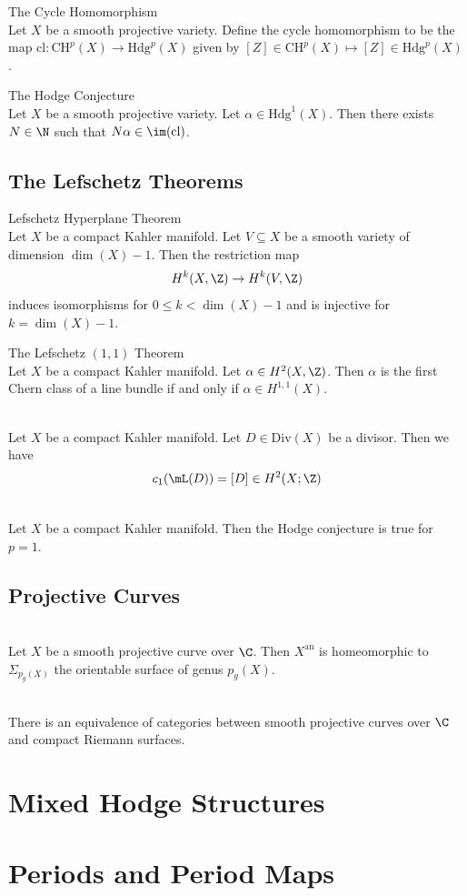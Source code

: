 \documentclass[a4paper]{article}
\begin{document}
\begin{defn}{The Cycle Homomorphism}{}\\
Let $X$ be a smooth projective variety. Define the cycle homomorphism to be the map $\text{cl}:\text{CH}^p(X)\to\text{Hdg}^p(X)$ given by $[Z]\in\text{CH}^p(X)\mapsto[Z]\in\text{Hdg}^p(X)$. 
\end{defn}

\begin{conj}{The Hodge Conjecture}{}\\
Let $X$ be a smooth projective variety. Let $\alpha\in\text{Hdg}^1(X)$. Then there exists $N\in\N$ such that $N\alpha\in\im(\text{cl})$. 
\end{conj}

\subsection{The Lefschetz Theorems}
\begin{thm}{Lefschetz Hyperplane Theorem}{}\\
Let $X$ be a compact Kahler manifold. Let $V\subseteq X$ be a smooth variety of dimension $\dim(X)-1$. Then the restriction map $$H^k(X,\Z)\to H^k(V,\Z)$$ induces isomorphisms for $0\leq k<\dim(X)-1$ and is injective for $k=\dim(X)-1$. 
\end{thm}

\begin{thm}{The Lefschetz $(1,1)$ Theorem}{}\\
Let $X$ be a compact Kahler manifold. Let $\alpha\in H^2(X,\Z)$. Then $\alpha$ is the first Chern class of a line bundle if and only if $\alpha\in H^{1,1}(X)$. 
\end{thm}

\begin{prp}{}{}\\
Let $X$ be a compact Kahler manifold. Let $D\in\text{Div}(X)$ be a divisor. Then we have $$c_1(\mL(D))=[D]\in H^2(X;\Z)$$
\end{prp}

\begin{crl}{}{}\\
Let $X$ be a compact Kahler manifold. Then the Hodge conjecture is true for $p=1$. 
\end{crl}

\subsection{Projective Curves}
\begin{prp}{}{}\\
Let $X$ be a smooth projective curve over $\C$. Then $X^\text{an}$ is homeomorphic to $\Sigma_{p_g(X)}$ the orientable surface of genus $p_g(X)$. 
\end{prp}

\begin{crl}{}{}\\
There is an equivalence of categories between smooth projective curves over $\C$ and compact Riemann surfaces. 
\end{crl}

\pagebreak
\section{Mixed Hodge Structures}

\pagebreak
\section{Periods and Period Maps}
\end{document}

